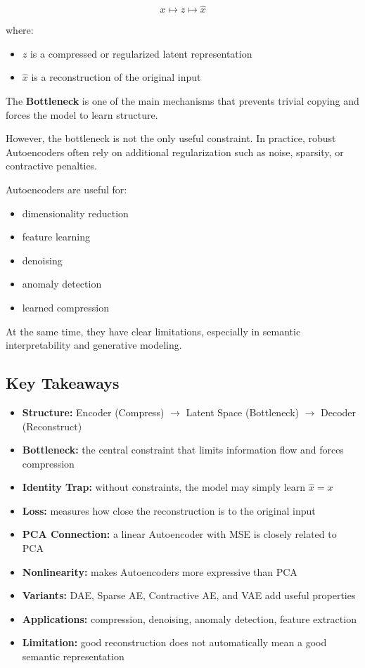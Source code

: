 \documentclass[
  italian,
  11pt,
]{article}
\begin{document}
\[
x \mapsto z \mapsto \hat{x}
\]

where:

\begin{itemize}
\item
  \(z\) is a compressed or regularized latent representation
\item
  \(\hat{x}\) is a reconstruction of the original input
\end{itemize}

The \textbf{Bottleneck} is one of the main mechanisms that prevents
trivial copying and forces the model to learn structure.

However, the bottleneck is not the only useful constraint. In practice,
robust Autoencoders often rely on additional regularization such as
noise, sparsity, or contractive penalties.

Autoencoders are useful for:

\begin{itemize}
\item
  dimensionality reduction
\item
  feature learning
\item
  denoising
\item
  anomaly detection
\item
  learned compression
\end{itemize}

At the same time, they have clear limitations, especially in semantic
interpretability and generative modeling.

\subsection{Key Takeaways}\label{key-takeaways-26}

\begin{itemize}
\item
  \textbf{Structure:} Encoder (Compress) \(\rightarrow\) Latent Space
  (Bottleneck) \(\rightarrow\) Decoder (Reconstruct)
\item
  \textbf{Bottleneck:} the central constraint that limits information
  flow and forces compression
\item
  \textbf{Identity Trap:} without constraints, the model may simply
  learn \(\hat{x} = x\)
\item
  \textbf{Loss:} measures how close the reconstruction is to the
  original input
\item
  \textbf{PCA Connection:} a linear Autoencoder with MSE is closely
  related to PCA
\item
  \textbf{Nonlinearity:} makes Autoencoders more expressive than PCA
\item
  \textbf{Variants:} DAE, Sparse AE, Contractive AE, and VAE add useful
  properties
\item
  \textbf{Applications:} compression, denoising, anomaly detection,
  feature extraction
\item
  \textbf{Limitation:} good reconstruction does not automatically mean a
  good semantic representation
\end{itemize}
\end{document}
